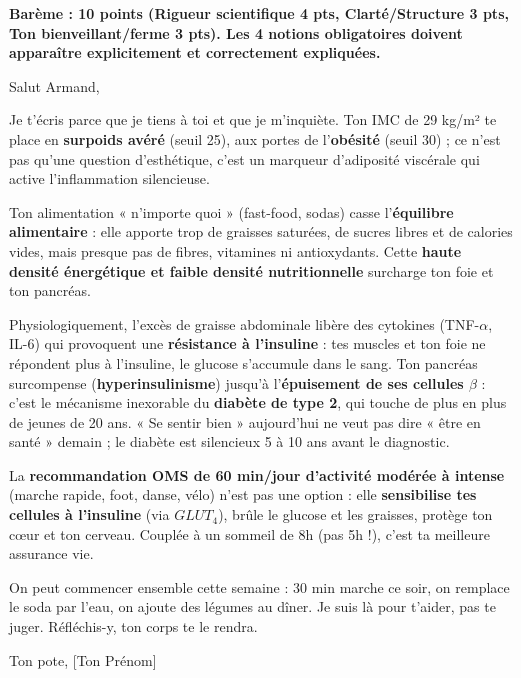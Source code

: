 \documentclass[11pt]{article}
\begin{document}
\begin{corrige}
\textbf{Barème : 10 points (Rigueur scientifique 4 pts, Clarté/Structure 3 pts, Ton bienveillant/ferme 3 pts). Les 4 notions obligatoires doivent apparaître explicitement et correctement expliquées.}

\begin{exemplebox}
Salut Armand,

Je t'écris parce que je tiens à toi et que je m'inquiète. Ton IMC de 29 kg/m² te place en \textbf{surpoids avéré} (seuil 25), aux portes de l'\textbf{obésité} (seuil 30) ; ce n'est pas qu'une question d'esthétique, c'est un marqueur d'adiposité viscérale qui active l'inflammation silencieuse.

Ton alimentation « n'importe quoi » (fast-food, sodas) casse l'\textbf{équilibre alimentaire} : elle apporte trop de graisses saturées, de sucres libres et de calories vides, mais presque pas de fibres, vitamines ni antioxydants. Cette \textbf{haute densité énergétique et faible densité nutritionnelle} surcharge ton foie et ton pancréas.

Physiologiquement, l'excès de graisse abdominale libère des cytokines (TNF-$\alpha$, IL-6) qui provoquent une \textbf{résistance à l'insuline} : tes muscles et ton foie ne répondent plus à l'insuline, le glucose s'accumule dans le sang. Ton pancréas surcompense (\textbf{hyperinsulinisme}) jusqu'à l'\textbf{épuisement de ses cellules $\beta$} : c'est le mécanisme inexorable du \textbf{diabète de type 2}, qui touche de plus en plus de jeunes de 20 ans. « Se sentir bien » aujourd'hui ne veut pas dire « être en santé » demain ; le diabète est silencieux 5 à 10 ans avant le diagnostic.

La \textbf{recommandation OMS de 60 min/jour d'activité modérée à intense} (marche rapide, foot, danse, vélo) n'est pas une option : elle \textbf{sensibilise tes cellules à l'insuline} (via $GLUT_4$), brûle le glucose et les graisses, protège ton cœur et ton cerveau. Couplée à un sommeil de 8h (pas 5h !), c'est ta meilleure assurance vie.

On peut commencer ensemble cette semaine : 30 min marche ce soir, on remplace le soda par l'eau, on ajoute des légumes au dîner. Je suis là pour t'aider, pas te juger. Réfléchis-y, ton corps te le rendra.

Ton pote,
[Ton Prénom]
\end{exemplebox}


\end{corrige}
\end{document}
